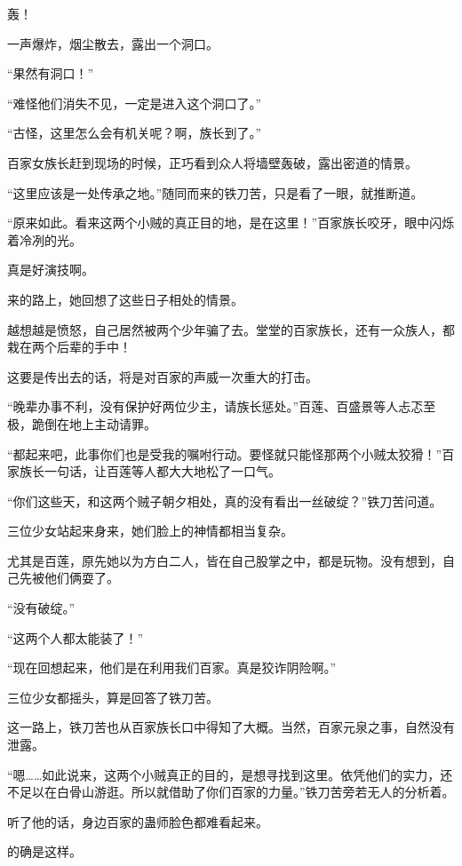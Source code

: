 
\begin{this_body}

轰！

一声爆炸，烟尘散去，露出一个洞口。

“果然有洞口！”

“难怪他们消失不见，一定是进入这个洞口了。”

“古怪，这里怎么会有机关呢？啊，族长到了。”

百家女族长赶到现场的时候，正巧看到众人将墙壁轰破，露出密道的情景。

“这里应该是一处传承之地。”随同而来的铁刀苦，只是看了一眼，就推断道。

“原来如此。看来这两个小贼的真正目的地，是在这里！”百家族长咬牙，眼中闪烁着冷冽的光。

真是好演技啊。

来的路上，她回想了这些日子相处的情景。

越想越是愤怒，自己居然被两个少年骗了去。堂堂的百家族长，还有一众族人，都栽在两个后辈的手中！

这要是传出去的话，将是对百家的声威一次重大的打击。

“晚辈办事不利，没有保护好两位少主，请族长惩处。”百莲、百盛景等人忐忑至极，跪倒在地上主动请罪。

“都起来吧，此事你们也是受我的嘱咐行动。要怪就只能怪那两个小贼太狡猾！”百家族长一句话，让百莲等人都大大地松了一口气。

“你们这些天，和这两个贼子朝夕相处，真的没有看出一丝破绽？”铁刀苦问道。

三位少女站起来身来，她们脸上的神情都相当复杂。

尤其是百莲，原先她以为方白二人，皆在自己股掌之中，都是玩物。没有想到，自己先被他们俩耍了。

“没有破绽。”

“这两个人都太能装了！”

“现在回想起来，他们是在利用我们百家。真是狡诈阴险啊。”

三位少女都摇头，算是回答了铁刀苦。

这一路上，铁刀苦也从百家族长口中得知了大概。当然，百家元泉之事，自然没有泄露。

“嗯……如此说来，这两个小贼真正的目的，是想寻找到这里。依凭他们的实力，还不足以在白骨山游逛。所以就借助了你们百家的力量。”铁刀苦旁若无人的分析着。

听了他的话，身边百家的蛊师脸色都难看起来。

的确是这样。


\end{this_body}
